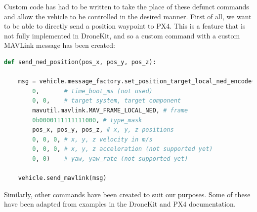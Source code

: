 \documentclass[11pt]{article}
\begin{document}
Custom code has had to be written to take the place of these defunct commands and allow the vehicle to be controlled in the desired manner. First of all, we want to be able to directly send a position waypoint to PX4. This is a feature that is not fully implemented in DroneKit, and so a custom command with a custom MAVLink message has been created:
\begin{lstlisting}[language=Python]
def send_ned_position(pos_x, pos_y, pos_z):

    msg = vehicle.message_factory.set_position_target_local_ned_encode(
        0,       # time_boot_ms (not used)
        0, 0,    # target system, target component
        mavutil.mavlink.MAV_FRAME_LOCAL_NED, # frame
        0b0000111111111000, # type_mask
        pos_x, pos_y, pos_z, # x, y, z positions
        0, 0, 0, # x, y, z velocity in m/s
        0, 0, 0, # x, y, z acceleration (not supported yet)
        0, 0)    # yaw, yaw_rate (not supported yet)

    vehicle.send_mavlink(msg)
\end{lstlisting}

Similarly, other commands have been created to suit our purposes. Some of these have been adapted from examples in the DroneKit and PX4 documentation\cite{PX4_dev_guide}\cite{dronekit}.
\end{document}
